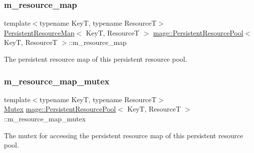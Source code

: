 \subsubsection{\texorpdfstring{m\+\_\+resource\+\_\+map}{m\_resource\_map}}
{\footnotesize\ttfamily template$<$typename KeyT, typename ResourceT$>$ \\
\hyperlink{namespacemage_a1eb49644c6b3b6a72fa342a7c1f54aed}{Persistent\+Resource\+Map}$<$ KeyT, ResourceT $>$ \hyperlink{classmage_1_1_persistent_resource_pool}{mage\+::\+Persistent\+Resource\+Pool}$<$ KeyT, ResourceT $>$\+::m\+\_\+resource\+\_\+map\hspace{0.3cm}{\ttfamily [private]}}

The persistent resource map of this persistent resource pool. \hypertarget{classmage_1_1_persistent_resource_pool_acd393008aa9fcebf06daa5ba2b8cc073}{}\label{classmage_1_1_persistent_resource_pool_acd393008aa9fcebf06daa5ba2b8cc073} 
\subsubsection{\texorpdfstring{m\+\_\+resource\+\_\+map\+\_\+mutex}{m\_resource\_map\_mutex}}
{\footnotesize\ttfamily template$<$typename KeyT, typename ResourceT$>$ \\
\hyperlink{structmage_1_1_mutex}{Mutex} \hyperlink{classmage_1_1_persistent_resource_pool}{mage\+::\+Persistent\+Resource\+Pool}$<$ KeyT, ResourceT $>$\+::m\+\_\+resource\+\_\+map\+\_\+mutex\hspace{0.3cm}{\ttfamily [private]}}

The mutex for accessing the persistent resource map of this persistent resource pool. 